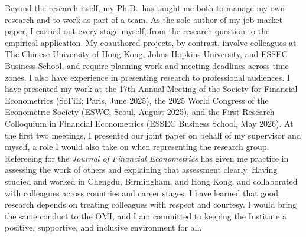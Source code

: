 \documentclass[12pt,a4paper]{article}
\begin{document}
Beyond the research itself, my Ph.D.\ has taught me both to manage my own research
and to work as part of a team.
As the sole author of my job market paper, I carried out every stage myself,
from the research question to the empirical application.
My coauthored projects, by contrast, involve colleagues at The Chinese University of Hong Kong,
Johns Hopkins University, and ESSEC Business School,
and require planning work and meeting deadlines across time zones.
I also have experience in presenting research to professional audiences. 
I have presented my work 
at the 17th Annual Meeting of the Society for Financial Econometrics
(SoFiE; Paris, June 2025), 
the 2025 World Congress of the Econometric Society (ESWC; Seoul, August 2025),
and the First Research Colloquium in Financial Econometrics (ESSEC Business School, May 2026).
At the first two meetings, I presented our joint paper on behalf of my supervisor and myself,
a role I would also take on when representing the research group.
Refereeing for the \textit{Journal of Financial Econometrics} has given me practice
in assessing the work of others and explaining that assessment clearly.
Having studied and worked in Chengdu, Birmingham, and Hong Kong,
and collaborated with colleagues across countries and career stages,
I have learned that good research depends on treating colleagues with respect and courtesy.
I would bring the same conduct to the OMI, and I am committed to keeping
the Institute a positive, supportive, and inclusive environment for all.
\end{document}
